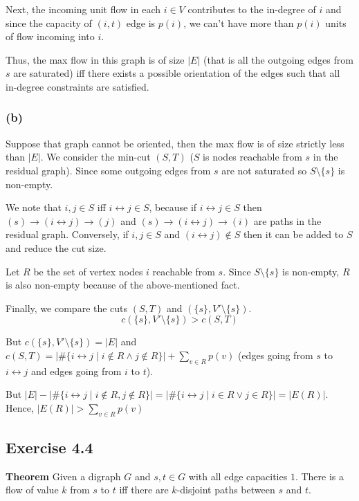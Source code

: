 \documentclass[12pt]{article}
\begin{document}
Next, the incoming unit flow in each $i \in V$ contributes to the in-degree of $i$ and since the capacity of $(i,t)$ edge is $p(i)$, we can't have more than $p(i)$ units of flow incoming into $i$.

Thus, the max flow in this graph is of size $|E|$ (that is all the outgoing edges from $s$ are saturated) iff there exists a possible orientation of the edges such that all in-degree constraints are satisfied.
\newline

\subsubsection*{(b)}
Suppose that graph cannot be oriented, then the max flow is of size strictly less than $|E|$. We consider the min-cut $(S,T)$ ($S$ is nodes reachable from $s$ in the residual graph). Since some outgoing edges from $s$ are not saturated so $S \setminus \{s\}$ is non-empty.

We note that $i, j \in S$ iff $i \leftrightarrow j \in S$, because if $i \leftrightarrow j \in S$ then $(s) \longrightarrow (i \leftrightarrow j) \longrightarrow (j)$ and $(s) \longrightarrow (i \leftrightarrow j) \longrightarrow (i)$ are paths in the residual graph. Conversely, if $i,j \in S$ and $(i \leftrightarrow j) \not \in S$ then it can be added to $S$ and reduce the cut size.

Let $R$ be the set of vertex nodes $i$ reachable from $s$. Since $S \setminus \{s\}$ is non-empty, $R$ is also non-empty because of the above-mentioned fact.

Finally, we compare the cuts $(S,T)$ and $(\{s\}, V' \setminus \{s\})$.
$$c(\{s\}, V' \setminus \{s\}) > c(S,T)$$

But $c(\{s\}, V' \setminus \{s\}) = |E|$ and $c(S,T) = |\#\{i \leftrightarrow j \mid i \not \in R \wedge j \not \in R\}| + \sum_{v \in R} p(v)$ (edges going from $s$ to $i \leftrightarrow j$ and edges going from $i$ to $t$).

But $|E| - |\#\{i \leftrightarrow j \mid i \not \in R, j \not \in R\}| = |\#\{i \leftrightarrow j \mid i \in R \vee j \in R\}| = |E(R)|$. Hence, $|E(R)| > \sum_{v \in R} p(v)$

\subsection*{Exercise 4.4}

\textbf{Theorem} Given a digraph $G$ and $s,t \in G$ with all edge capacities $1$. There is a flow of value $k$ from $s$ to $t$ iff there are $k$-disjoint paths between $s$ and $t$.
\end{document}
